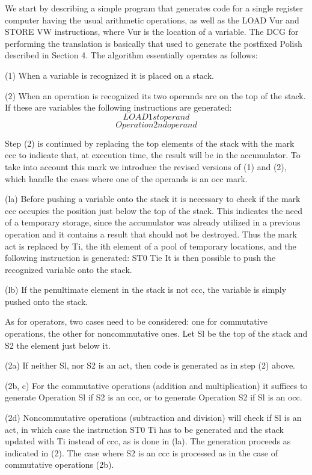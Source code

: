 
We start by describing a simple program that generates code for a single register
computer having the usual arithmetic operations, as well as the LOAD Vur and
STORE VW instructions, where Vur is the location of a variable. The DCG for
performing the translation is basically that used to generate the postfixed Polish
described in Section 4. The algorithm essentially operates as follows:

(1) When a variable is recognized it is placed on a stack.

(2) When an operation is recognized its two operands are on the top of the stack.
If these are variables the following instructions are generated:
\[LOAD 1st operand\]
\[Operation 2nd operand\]

Step (2) is continued by replacing the top elements of the stack with the mark
ccc to indicate that, at execution time, the result will be in the accumulator. To
take into account this mark we introduce the revised versions of (1) and (2),
which handle the cases where one of the operands is an occ mark.

(la) Before pushing a variable onto the stack it is necessary to check if the mark
ccc occupies the position just below the top of the stack. This indicates the
need of a temporary storage, since the accumulator was already utilized in
a previous operation and it contains a result that should not be destroyed.
Thus the mark act is replaced by Ti, the ith element of a pool of temporary
locations, and the following instruction is generated: ST0 Tie It is then
possible to push the recognized variable onto the stack.

(lb) If the penultimate element in the stack is not ccc, the variable is simply
pushed onto the stack.  

As for operators, two cases need to be considered: one for commutative
operations, the other for noncommutative ones. Let Sl be the top of the stack
and S2 the element just below it.

(2a) If neither Sl, nor S2 is an act, then code is generated as in step (2) above.

(2b, c) For the commutative operations (addition and multiplication) it suffices
to generate
Operation Sl if S2 is an ccc, or to generate
Operation S2 if Sl is an occ.

(2d) Noncommutative operations (subtraction and division) will check if Sl
is an act, in which case the instruction ST0 Ti has to be generated and
the stack updated with Ti instead of ccc, as is done in (la). The generation
proceeds as indicated in (2). The case where S2 is an ccc is processed as
in the case of commutative operations (2b).

